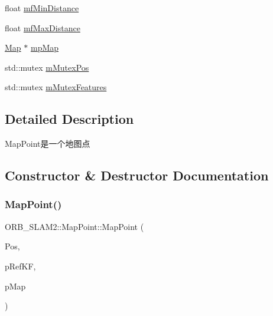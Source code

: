 \begin{DoxyCompactItemize}
\item 
float \mbox{\hyperlink{class_o_r_b___s_l_a_m2_1_1_map_point_ac179383327d65067da6febe55cbfc32a}{mf\+Min\+Distance}}
\item 
float \mbox{\hyperlink{class_o_r_b___s_l_a_m2_1_1_map_point_afc04bae1b7819dd158a572de56074f63}{mf\+Max\+Distance}}
\item 
\mbox{\hyperlink{class_o_r_b___s_l_a_m2_1_1_map}{Map}} $\ast$ \mbox{\hyperlink{class_o_r_b___s_l_a_m2_1_1_map_point_aad9ad02a540966d12b75460238290d90}{mp\+Map}}
\item 
std\+::mutex \mbox{\hyperlink{class_o_r_b___s_l_a_m2_1_1_map_point_a592b97bed3453c0a599336fa848a8cef}{m\+Mutex\+Pos}}
\item 
std\+::mutex \mbox{\hyperlink{class_o_r_b___s_l_a_m2_1_1_map_point_a3ab20d400977581ac45a109f5544ffda}{m\+Mutex\+Features}}
\end{DoxyCompactItemize}


\subsection{Detailed Description}
Map\+Point是一个地图点 

\subsection{Constructor \& Destructor Documentation}
\mbox{\label{class_o_r_b___s_l_a_m2_1_1_map_point_ae8b6d24a7f79cfd260502859cb5b6901}} 
\subsubsection{\texorpdfstring{Map\+Point()}{MapPoint()}\hspace{0.1cm}{\footnotesize\ttfamily [1/2]}}
{\footnotesize\ttfamily O\+R\+B\+\_\+\+S\+L\+A\+M2\+::\+Map\+Point\+::\+Map\+Point (\begin{DoxyParamCaption}\item[{const cv\+::\+Mat \&}]{Pos,  }\item[{\mbox{\hyperlink{class_o_r_b___s_l_a_m2_1_1_key_frame}{Key\+Frame}} $\ast$}]{p\+Ref\+KF,  }\item[{\mbox{\hyperlink{class_o_r_b___s_l_a_m2_1_1_map}{Map}} $\ast$}]{p\+Map }\end{DoxyParamCaption})}



